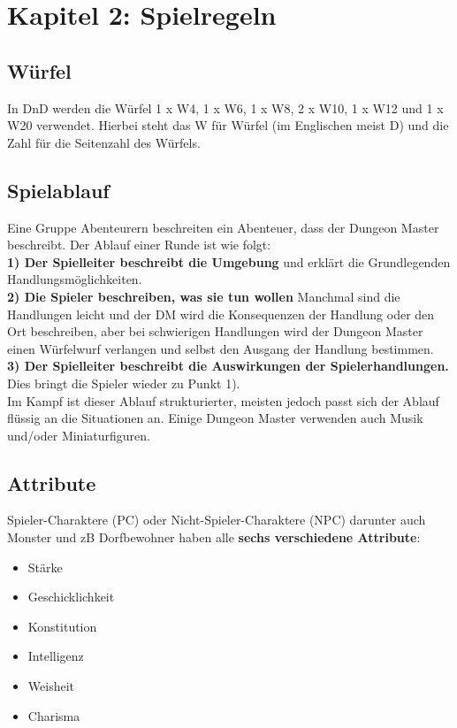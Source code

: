 \chapter{Kapitel 2: Spielregeln}
\section{Würfel}
In DnD werden die Würfel 1 x W4, 1 x W6, 1 x W8, 2 x W10, 1 x W12 und 1 x W20 verwendet. Hierbei steht das W für Würfel (im Englischen meist D) und die Zahl für die Seitenzahl des Würfels.
\section{Spielablauf}
Eine Gruppe Abenteurern beschreiten ein Abenteuer, dass der Dungeon Master beschreibt. Der Ablauf einer Runde ist wie folgt: \\ \noindent \textbf{1) Der Spielleiter beschreibt die Umgebung} und erklärt die Grundlegenden Handlungsmöglichkeiten. \\
\noindent \textbf{2) Die Spieler beschreiben, was sie tun wollen}
\noindent Manchmal sind die Handlungen leicht und der DM wird die Konsequenzen der Handlung oder den Ort beschreiben, aber bei schwierigen Handlungen wird der Dungeon Master einen Würfelwurf verlangen und selbst den Ausgang der Handlung bestimmen. \\
\noindent \textbf{3) Der Spielleiter beschreibt die Auswirkungen der Spielerhandlungen.} Dies bringt die Spieler wieder zu Punkt 1).\\
\noindent  Im Kampf ist dieser Ablauf strukturierter, meisten jedoch passt sich der Ablauf flüssig an die Situationen an. Einige Dungeon Master verwenden auch Musik und/oder Miniaturfiguren.

\section{Attribute}
Spieler-Charaktere (PC) oder Nicht-Spieler-Charaktere (NPC) darunter auch Monster und zB Dorfbewohner haben alle \textbf{sechs verschiedene Attribute}:

\begin{itemize}
  \item Stärke
  \item Geschicklichkeit
  \item Konstitution
  \item Intelligenz
  \item Weisheit
  \item Charisma
\end{itemize}


